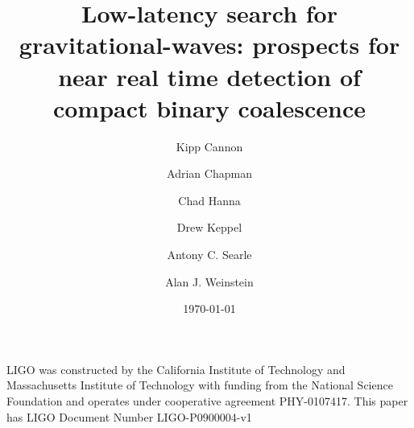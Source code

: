 \documentclass[aps,prd,twocolumn,showpacs,groupedaddress,showkeys,preprintnumbers]{revtex4}
\begin{document}
\title{Low-latency search for gravitational-waves: prospects for near real time detection of compact binary coalescence} 

\date{\today}

\author{Kipp Cannon} 

\author{Adrian Chapman} 

\author{Chad Hanna}  

\author{Drew Keppel}  

\author{Antony C. Searle}


\author{Alan J. Weinstein}


\begin{abstract}

\end{abstract}

\pacs{}


\preprint{}

\maketitle











\begin{acknowledgments}
LIGO was constructed by the California Institute of Technology and Massachusetts Institute of Technology with funding from the National Science Foundation and operates under cooperative agreement PHY-0107417. This paper has LIGO Document Number LIGO-P0900004-v1

\end{acknowledgments}

\appendix


\end{document}
